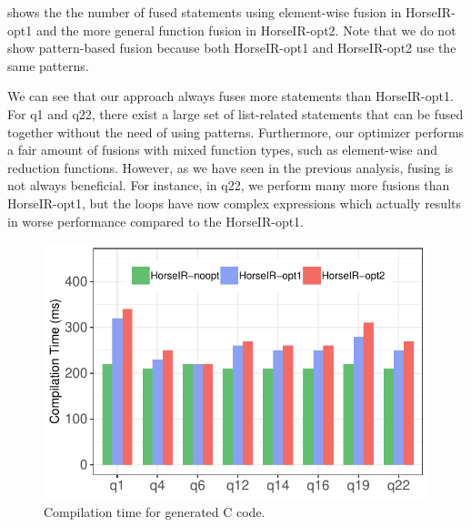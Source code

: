  shows the the number of fused statements using
element-wise fusion in HorseIR-opt1 and the more general function fusion in
HorseIR-opt2.  Note that we do not show pattern-based fusion because both
HorseIR-opt1 and HorseIR-opt2 use the same patterns. 

We can see that our approach always fuses more statements than HorseIR-opt1.
For q1 and q22, there exist a large set of list-related statements that can be
fused together without the need of using patterns.  Furthermore, our optimizer
performs a fair amount of fusions with mixed function types, such as
element-wise and reduction functions.
However, as we have seen in the previous analysis, fusing is not always
beneficial. For instance, in q22, we perform many more fusions than
HorseIR-opt1, but the loops have now complex expressions which actually results
in worse performance compared to the HorseIR-opt1. 

\begin{figure}[htbp]
\centering
\includegraphics[width=.9\columnwidth]{./src/figure/compile-time.pdf}
\caption{Compilation time for generated C code.}
\label{fig:compilation_time}
\end{figure}




